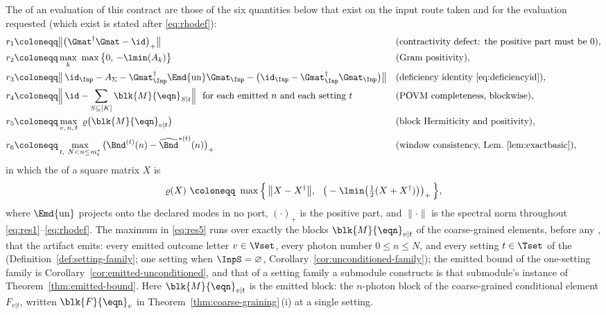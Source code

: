\begin{definition}\label{def:residuals}
The  of an evaluation of this contract are those of the six quantities
below that exist on the input route taken and for the evaluation requested
(which exist is stated after \eqref{eq:rhodef}):
\begin{align}
  r_1&\coloneqq\big\lVert\big(\Gmat^\dagger\Gmat-\id\big)_{+}\big\rVert
    &&\text{(contractivity defect: the positive part must be }0),
    \label{eq:res1}\\
  r_2&\coloneqq\max_k\ \max\big\{0,\,-\lmin(A_k)\big\}
    &&\text{(Gram positivity)},\label{eq:res2}\\
  r_3&\coloneqq\big\lVert\,\id_{\Inp}-A_\Sigma
     -\Gmat_{\Inp}^\dagger\Emd{\mathrm{un}}\Gmat_{\Inp}
     -\big(\id_{\Inp}-\Gmat_{\Inp}^\dagger\Gmat_{\Inp}\big)\big\rVert
    &&\text{(deficiency identity \eqref{eq:deficiencyid})},\label{eq:res3}\\
  r_4&\coloneqq\Big\lVert\,\id-\sum_{S\subseteq[K]}
     \blk{M}{\eqn}_{S|t}\Big\rVert\ \ \text{for each emitted }n
     \text{ and each setting }t
    &&\text{(POVM completeness, blockwise)},\label{eq:res4}\\
  r_5&\coloneqq\max_{v,\,n,\,t}\ \varrho\big(\blk{M}{\eqn}_{v|t}\big)
    &&\text{(block Hermiticity and positivity)},\label{eq:res5}\\
  r_6&\coloneqq\max_{t,\ N<n\le m^{\ast}_t}
     \big(\Bnd^{(t)}(n)-\widehat\Bnd^{\ast(t)}(n)\big)_{+}
    &&\text{(window consistency, Lem.~\ref{lem:exactbasic})},\label{eq:res6}
\end{align}
in which the  of a square matrix $X$ is
\begin{equation}\label{eq:rhodef}
  \varrho(X)\ \coloneqq\ \max\Big\{\,\big\lVert X-X^\dagger\big\rVert,\ \
    \big(-\lmin\big(\tfrac12(X+X^\dagger)\big)\big)_{+}\,\Big\} ,
\end{equation}
where $\Emd{\mathrm{un}}$ projects onto the declared modes in no port,
$(\cdot)_+$ is the positive part, and $\lVert\cdot\rVert$ is the spectral norm
throughout \eqref{eq:res1}--\eqref{eq:rhodef}. The maximum in \eqref{eq:res5}
runs over exactly the blocks $\blk{M}{\eqn}_{v|t}$ of the coarse-grained
elements, before any \tref{dark-count channel}, that the artifact emits: every
emitted outcome letter
$v\in\Vset$, every photon number $0\le n\le N$, and every setting $t\in\Tset$
of the \tref{setting family} (Definition~\ref{def:setting-family}; one setting when
$\InpS=\varnothing$, Corollary~\ref{cor:unconditioned-family}); the emitted
bound of the one-setting family is Corollary~\ref{cor:emitted-unconditioned},
and that of a setting family a submodule constructs is that submodule's
instance of Theorem~\ref{thm:emitted-bound}. Here $\blk{M}{\eqn}_{v|t}$ is the
emitted block: the $n$-photon block of the coarse-grained conditional element
$F_{v|t}$, written $\blk{F}{\eqn}_v$ in Theorem~\ref{thm:coarse-graining}\,(i) at a single
setting.


\end{definition}
